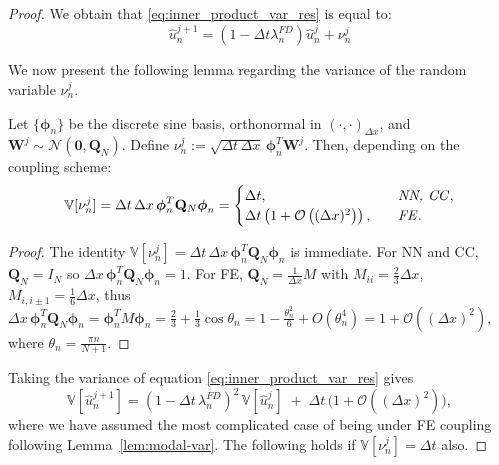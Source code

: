 \begin{proof}
We obtain that \eqref{eq:inner_product_var_res} is equal to:
\begin{equation}
    \hat{u}_n^{j+1} = (1 - \Delta t \lambda_n^{FD}) \hat{u}_n^j + 
    \nu_n^j
\end{equation}

We now present the following lemma regarding the variance of the random 
variable $\nu_n^j$. 

\begin{lemma}\label{lem:modal-var}
Let $\{\boldsymbol{\phi}_n\}$ be the discrete sine basis, orthonormal in $(\cdot,\cdot)_{\Delta x}$, and
$\mathbf W^j\sim\mathcal N(\mathbf 0,\mathbf Q_N)$. Define
$\nu_n^j:=\sqrt{\Delta t\,\Delta x}\,\boldsymbol{\phi}_n^T \mathbf W^j$.
Then, depending on the coupling scheme:
\begin{equation*}
\mathbb{V}[\nu_n^j]
= \Delta t\,\Delta x\,\boldsymbol{\phi}_n^T \mathbf Q_N \boldsymbol{\phi}_n
=
\begin{cases}
\Delta t, &\text{\emph{NN, CC}},\\
\Delta t \left(1+\mathcal{O}\left((\Delta x)^2\right)\right),\quad
&\text{\emph{FE}}.
\end{cases}
\end{equation*}
\end{lemma}

\begin{proof}
The identity $\mathbb{V}[\nu_n^j]=\Delta t\,\Delta x\,\boldsymbol{\phi}_n^T 
\mathbf Q_N \boldsymbol{\phi}_n$
is immediate. For NN and CC, $\mathbf Q_N=I_N$ so 
$\Delta x\,\boldsymbol{\phi}_n^T \mathbf Q_N\boldsymbol{\phi}_n=1$.
For FE, $\mathbf Q_N=\tfrac{1}{\Delta x}M$ with 
$M_{ii}=\tfrac{2}{3}\Delta x$, $M_{i,i\pm1}=\tfrac{1}{6}\Delta x$,
thus $\Delta x\,\boldsymbol{\phi}_n^T \mathbf Q_N \boldsymbol{\phi}_n
= \boldsymbol{\phi}_n^T M\boldsymbol{\phi}_n
= \tfrac{2}{3}+\tfrac{1}{3}\cos\theta_n
= 1-\tfrac{\theta_n^2}{6}+O(\theta_n^4)
= 1+\mathcal{O}\left((\Delta x)^2\right)$, where $\theta_n = \frac{\pi n}{N+1}.$\qedhere
\end{proof}

Taking the variance of equation \eqref{eq:inner_product_var_res} gives
\begin{equation}\label{eq:var_of_relation_general}
  \mathbb{V}[\hat u_n^{j+1}]
  = (1-\Delta t\,\lambda_n^{FD})^2\,\mathbb{V}[\hat u_n^{j}]
    \;+\; \Delta t\,\big(1 + \mathcal{O}\left((\Delta x)^2\right)\big),
\end{equation}
where we have assumed the most complicated case of 
being under FE coupling following Lemma~\ref{lem:modal-var}. The 
following holds if $\mathbb{V}[\nu_n^j] = \Delta t$ also.


\end{proof}
